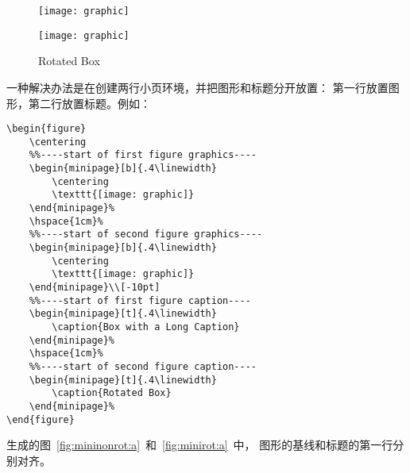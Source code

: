 \begin{figure}
	\centering
	\begin{minipage}[t]{.4\linewidth}
		\centering
		\texttt{[image: graphic]}
		\caption{Box with a Long Caption}\label{fig:mininonrot} 
	\end{minipage}%
	\hspace{1cm}%
	\begin{minipage}[t]{.4\linewidth}
		\centering
		\texttt{[image: graphic]}
		\caption{Rotated Box}\label{fig:minirot} 
	\end{minipage}%
\end{figure}

一种解决办法是在创建两行小页环境，并把图形和标题分开放置：
第一行放置图形，第二行放置标题。例如：
\begin{lstlisting}
\begin{figure}
	\centering
	%%----start of first figure graphics----
	\begin{minipage}[b]{.4\linewidth}
		\centering
		\texttt{[image: graphic]}
	\end{minipage}%
	\hspace{1cm}%
	%%----start of second figure graphics----
	\begin{minipage}[b]{.4\linewidth}
		\centering
		\texttt{[image: graphic]}
	\end{minipage}\\[-10pt]
	%%----start of first figure caption----
	\begin{minipage}[t]{.4\linewidth}
		\caption{Box with a Long Caption}
	\end{minipage}%
	\hspace{1cm}%
	%%----start of second figure caption----
	\begin{minipage}[t]{.4\linewidth}
		\caption{Rotated Box}
	\end{minipage}%
\end{figure}
\end{lstlisting}
生成的图~\ref{fig:mininonrot:a}~和~\ref{fig:minirot:a}~中，
图形的基线和标题的第一行分别对齐。

